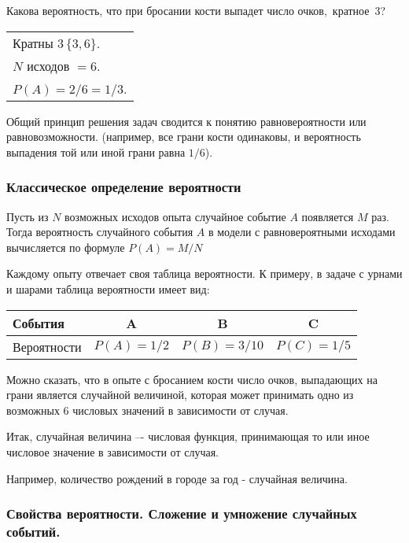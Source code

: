 ﻿\documentclass[a4paper,12pt]{report}
\begin{document}
	 Какова вероятность, что при бросании кости выпадет число очков,~кратное~3?

	\strut


	\begin{tabular}{l}

	Кратны $3\,\{3,6\}$.\\ 

	$N$ исходов $ = 6$.\\

	$P(A) = 2/6 = 1/3$.\\

	\end{tabular}


	\sstrut Общий принцип решения задач сводится к понятию равновероятности или равновозможности. (например, все грани кости одинаковы, и вероятность выпадения той или иной грани равна $1/6$).



\subsubsection{Классическое определение вероятности}

	Пусть из $N$ возможных исходов опыта случайное событие $A$ появляется $M$ раз. Тогда вероятность случайного события $A$ в модели с равновероятными исходами вычисляется по формуле $P(A) = M/N$ 

	Каждому опыту отвечает своя таблица вероятности. К примеру, в задаче с урнами и шарами таблица вероятности имеет вид: \strut


	\begin{tabular}{|l|c|c|c|}
	\hline
		События & A & B & C\\
	\hline	
		Вероятности & $P(A) = 1/2$ & $P(B) = 3/10$ & $P(C) = 1/5$\\
	\hline
	\end{tabular}


	\strut Можно сказать, что в опыте с бросанием кости число очков, выпадающих на грани является случайной величиной, которая может принимать одно из возможных 6 числовых значений в зависимости от случая.

	Итак, случайная величина –- числовая функция, принимающая то или иное числовое значение в зависимости от случая.

	Например, количество рождений в городе за год - случайная величина.





\subsubsection{Свойства вероятности. Сложение и умножение случайных событий.}
\end{document}
